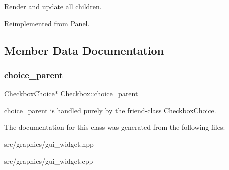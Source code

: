 Render and update all children. 

Reimplemented from \mbox{\hyperlink{class_panel_a9e9c0608cf3139833cde6b73dc3ba443}{Panel}}.



\subsection{Member Data Documentation}
\mbox{\label{class_checkbox_adf30cd14778fdae212e6c97ec456a700}} 
\subsubsection{\texorpdfstring{choice\+\_\+parent}{choice\_parent}}
{\footnotesize\ttfamily \mbox{\hyperlink{class_checkbox_choice}{Checkbox\+Choice}}$\ast$ Checkbox\+::choice\+\_\+parent\hspace{0.3cm}{\ttfamily [protected]}}

choice\+\_\+parent is handled purely by the friend-\/class \mbox{\hyperlink{class_checkbox_choice}{Checkbox\+Choice}}. 

The documentation for this class was generated from the following files\+:\begin{DoxyCompactItemize}
\item 
src/graphics/gui\+\_\+widget.\+hpp\item 
src/graphics/gui\+\_\+widget.\+cpp\end{DoxyCompactItemize}
